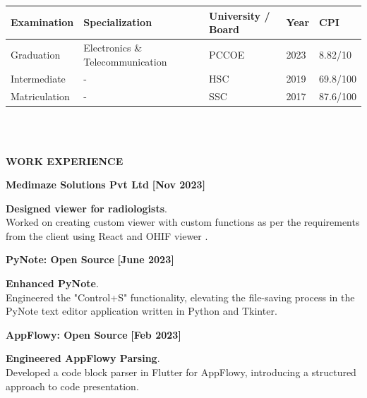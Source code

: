 \documentclass[a4paper,10pt]{article}
\begin{document}
\vspace{-.8cm}

\begin{tabularx}{.98\textwidth}{llp{2cm}lll}
  \hline
  \textbf{Examination} & \textbf{Specialization}          &  & \textbf{University / Board} & \textbf{Year} & \textbf{CPI} \\
  \hline
  Graduation           & Electronics \& Telecommunication &  & PCCOE                       & 2023          & 8.82/10      \\
  Intermediate         & -                                &  & HSC                         & 2019          & 69.8/100     \\
  Matriculation        & -                                &  & SSC                         & 2017          & 87.6/100     \\
  \hline
\end{tabularx}
\\\\

\colorbox{titleColor}{\parbox{6.7in}{\textbf{WORK EXPERIENCE}}}

\begin{itemize*}
  \setlength{\itemsep}{.00pt}
  \item \textbf{{Medimaze Solutions Pvt Ltd}} \hfill {\small{{\textbf{[Nov 2023]}}\/}}
  \begin{itemize*}
    \item \textbf{Designed viewer for radiologists}.\\
    Worked on creating custom viewer with custom functions as per the requirements from the client using React and OHIF viewer .
  \end{itemize*}
\end{itemize*}

\begin{itemize*}
  \setlength{\itemsep}{.00pt}
  \item \textbf{{PyNote: Open Source}} \hfill {\small{{\textbf{[June 2023]}}\/}}
  \begin{itemize*}
    \item \textbf{Enhanced PyNote}.\\
    Engineered the "Control+S" functionality, elevating the file-saving process in the PyNote text editor application written in Python and Tkinter.
  \end{itemize*}
\end{itemize*}

\begin{itemize*}
  \setlength{\itemsep}{.00pt}
  \item \textbf{{AppFlowy: Open Source}} \hfill {\small{{\textbf{[Feb 2023]}}\/}}
  \begin{itemize*}
    \item \textbf{Engineered AppFlowy Parsing}.\\
    Developed a code block parser in Flutter for AppFlowy, introducing a structured approach to code presentation.
  \end{itemize*}
\end{itemize*}
\end{document}
